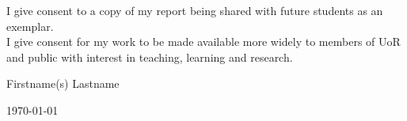 \documentclass[a4paper,11pt,oneside]{book}
\begin{document}
\noindent
I give consent to a copy of my report being shared with future
students as an exemplar. \\

\noindent
I give consent for my work to be made available more widely to
members of UoR and public with interest in teaching, learning and research.
~\\[1cm]
\begin{flushright}
  Firstname(s) Lastname %

  \today
\end{flushright}





\tableofcontents
\listoffigures
\listoftables

\mainmatter










\begin{appendices}
  
  
\end{appendices}
\end{document}
